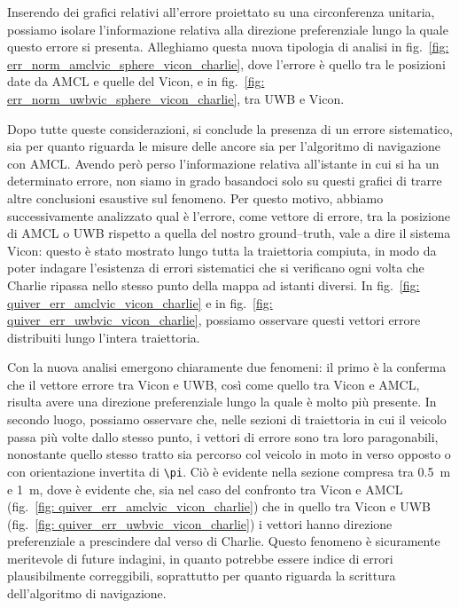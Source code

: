 \vspace{0.5cm}
Inserendo dei grafici relativi all'errore proiettato su una circonferenza unitaria, possiamo isolare l'informazione relativa alla direzione preferenziale lungo la quale questo errore si presenta.
Alleghiamo questa nuova tipologia di analisi in fig.~\ref{fig: err_norm_amclvic_sphere_vicon_charlie}, dove l'errore è quello tra le posizioni date da AMCL e quelle del Vicon, e in fig.~\ref{fig: err_norm_uwbvic_sphere_vicon_charlie}, tra UWB e Vicon. 

\vspace{0.5cm}
Dopo tutte queste considerazioni, si conclude la presenza di un errore sistematico, sia per quanto riguarda le misure delle ancore sia per l'algoritmo di navigazione con AMCL. 
Avendo però perso l'informazione relativa all'istante in cui si ha un determinato errore, non siamo in grado basandoci solo su questi grafici di trarre altre conclusioni esaustive sul fenomeno. 
Per questo motivo, abbiamo successivamente analizzato qual è l'errore, come vettore di errore, tra la posizione di AMCL o UWB rispetto a quella del nostro ground--truth, vale a dire il sistema Vicon: questo è stato mostrato lungo tutta la traiettoria compiuta, in modo da poter indagare l'esistenza di errori sistematici che si verificano ogni volta che Charlie ripassa nello stesso punto della mappa ad istanti diversi. 
In fig.~\ref{fig: quiver_err_amclvic_vicon_charlie} e in fig.~\ref{fig: quiver_err_uwbvic_vicon_charlie}, possiamo osservare questi vettori errore distribuiti lungo l'intera traiettoria. 

Con la nuova analisi emergono chiaramente due fenomeni: il primo è la conferma che il vettore errore tra Vicon e UWB, così come quello tra Vicon e AMCL, risulta avere una direzione preferenziale lungo la quale è molto più presente. 
In secondo luogo, possiamo osservare che, nelle sezioni di traiettoria in cui il veicolo passa più volte dallo stesso punto, i vettori di errore sono tra loro paragonabili, nonostante quello stesso tratto sia percorso col veicolo in moto in verso opposto o con orientazione invertita di \verb|\pi|. 
Ciò è evidente nella sezione compresa tra \SI{0.5}{\metre} e \SI{1}{\metre}, dove è evidente che, sia nel caso del confronto tra Vicon e AMCL (fig.~\ref{fig: quiver_err_amclvic_vicon_charlie}) che in quello tra Vicon e UWB (fig.~\ref{fig: quiver_err_uwbvic_vicon_charlie}) i vettori hanno direzione preferenziale a prescindere dal verso di Charlie.
Questo fenomeno è sicuramente meritevole di future indagini, in quanto potrebbe essere indice di errori plausibilmente correggibili, soprattutto per quanto riguarda la scrittura dell'algoritmo di navigazione.


